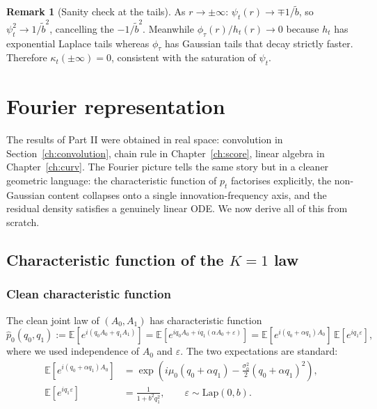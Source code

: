 \documentclass[11pt,a4paper,openany]{book}
\theoremstyle{plainserif}
\theoremstyle{definition}
\theoremstyle{remarkstyle}
\newtheorem*{remark}{Remark}
\newcommand{\E}{\mathbb{E}}
\newcommand{\Lap}{\mathrm{Lap}}
\newcommand{\btilde}{\tilde{b}}
\newcommand{\hatfn}[1]{\widehat{#1}}
\begin{document}
\begin{remark}[Sanity check at the tails]
As $r\to\pm\infty$: $\psi_t(r)\to\mp 1/\btilde$, so $\psi_t^2\to 1/\btilde^2$,
cancelling the $-1/\btilde^2$. Meanwhile $\phi_\tau(r)/h_t(r)\to 0$ because
$h_t$ has exponential Laplace tails whereas $\phi_\tau$ has Gaussian tails
that decay strictly faster. Therefore $\kappa_t(\pm\infty) = 0$, consistent
with the saturation of $\psi_t$.
\end{remark}


\part{Fourier representation}

The results of Part II were obtained in real space: convolution in
Section~\ref{ch:convolution}, chain rule in Chapter~\ref{ch:score},
linear algebra in Chapter~\ref{ch:curv}. The Fourier picture tells the
same story but in a cleaner geometric language: the characteristic
function of $p_t$ factorises explicitly, the non-Gaussian content
collapses onto a single innovation-frequency axis, and the residual
density satisfies a genuinely linear ODE. We now derive all of this
from scratch.

\chapter{Characteristic function of the $K{=}1$ law}
\label{ch:fourier}

\section{Clean characteristic function}

The clean joint law of $(A_0, A_1)$ has characteristic function
\begin{equation}
\hatfn{p}_0(q_0, q_1) := \E\!\left[ e^{i(q_0 A_0 + q_1 A_1)} \right]
 = \E\!\left[ e^{i q_0 A_0 + i q_1 (\alpha A_0 + \varepsilon)} \right]
 = \E\!\left[ e^{i(q_0 + \alpha q_1) A_0} \right]\,
   \E\!\left[ e^{i q_1 \varepsilon} \right],
\label{eq:clean-cf}
\end{equation}
where we used independence of $A_0$ and $\varepsilon$. The two
expectations are standard:
\begin{align}
\E\!\left[ e^{i(q_0+\alpha q_1) A_0} \right]
 &= \exp\!\left( i\mu_0 (q_0+\alpha q_1) - \tfrac{\sigma_0^2}{2}(q_0+\alpha q_1)^2\right), \\
\E\!\left[ e^{i q_1 \varepsilon} \right]
 &= \frac{1}{1 + b^2 q_1^2}, \qquad \varepsilon \sim \Lap(0,b).
\end{align}
\end{document}
